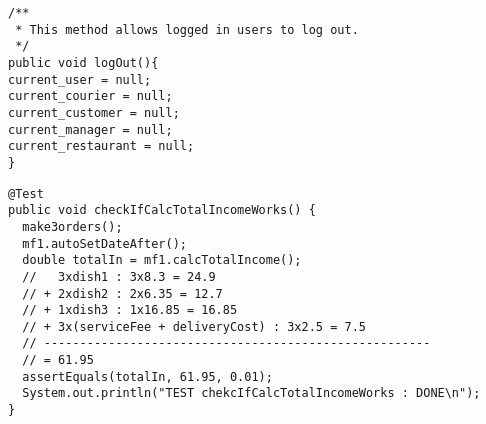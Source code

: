 \begin{lstlisting}[caption=the main methods for the log in log out system.,
  label=lst:logout]
/**
 * This method allows logged in users to log out.
 */
public void logOut(){
current_user = null;
current_courier = null;
current_customer = null;
current_manager = null;
current_restaurant = null;
}
\end{lstlisting}


\begin{lstlisting}[caption=Example of a test using \texttt{assertEquals} with 2 decimal precision.,
  label=lst:test_total_income]
@Test
public void checkIfCalcTotalIncomeWorks() {
  make3orders();
  mf1.autoSetDateAfter();
  double totalIn = mf1.calcTotalIncome();
  //   3xdish1 : 3x8.3 = 24.9
  // + 2xdish2 : 2x6.35 = 12.7
  // + 1xdish3 : 1x16.85 = 16.85
  // + 3x(serviceFee + deliveryCost) : 3x2.5 = 7.5
  // ------------------------------------------------------
  // = 61.95
  assertEquals(totalIn, 61.95, 0.01);
  System.out.println("TEST chekcIfCalcTotalIncomeWorks : DONE\n");
}
\end{lstlisting}

  
  
  
\lstset{basicstyle=\rm\small\ttfamily}
